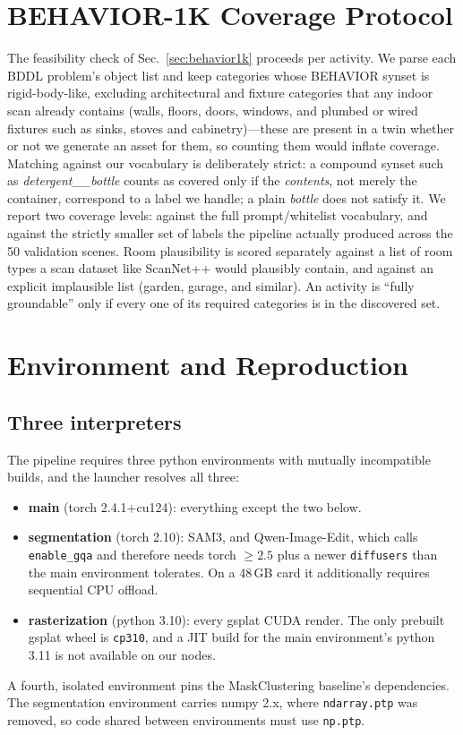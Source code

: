 \section{BEHAVIOR-1K Coverage Protocol}
\label{app:behavior}
The feasibility check of Sec.~\ref{sec:behavior1k} proceeds per activity.
We parse each BDDL problem's object list and keep categories whose
BEHAVIOR synset is rigid-body-like, excluding architectural and fixture
categories that any indoor scan already contains (walls, floors, doors,
windows, and plumbed or wired fixtures such as sinks, stoves and
cabinetry)---these are present in a twin whether or not we generate an
asset for them, so counting them would inflate coverage. Matching against
our vocabulary is deliberately strict: a compound synset such as
\emph{detergent\_\_bottle} counts as covered only if the \emph{contents},
not merely the container, correspond to a label we handle; a plain
\emph{bottle} does not satisfy it. We report two coverage levels: against
the full prompt/whitelist vocabulary, and against the strictly smaller set
of labels the pipeline actually produced across the 50 validation scenes.
Room plausibility is scored separately against a list of room types a scan
dataset like ScanNet++ would plausibly contain, and against an explicit
implausible list (garden, garage, and similar). An activity is ``fully
groundable'' only if every one of its required categories is in the
discovered set.

\section{Environment and Reproduction}
\label{app:env}

\subsection{Three interpreters}
The pipeline requires three python environments with mutually incompatible
builds, and the launcher resolves all three:
\begin{itemize}
\item \textbf{main} (torch 2.4.1+cu124): everything except the two below.
\item \textbf{segmentation} (torch 2.10): SAM3, and Qwen-Image-Edit, which
  calls \texttt{enable\_gqa} and therefore needs torch $\geq2.5$ plus a
  newer \texttt{diffusers} than the main environment tolerates. On a
  48\,GB card it additionally requires sequential CPU offload.
\item \textbf{rasterization} (python 3.10): every gsplat CUDA render. The
  only prebuilt gsplat wheel is \texttt{cp310}, and a JIT build for the
  main environment's python 3.11 is not available on our nodes.
\end{itemize}
A fourth, isolated environment pins the MaskClustering baseline's
dependencies. The segmentation environment carries numpy 2.x, where
\texttt{ndarray.ptp} was removed, so code shared between environments must
use \texttt{np.ptp}.

